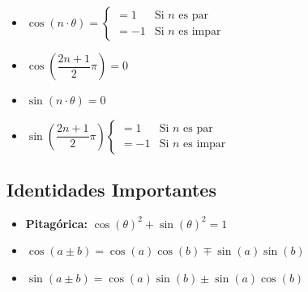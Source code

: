 \documentclass[12pt, fleqn]{report}                             %
\newcommand{\Wrap}[1]{\left( #1 \right)}                        %
\newcommand{\Cos}[1]{\cos\Wrap{#1}}                             %
\newcommand{\Sin}[1]{\sin\Wrap{#1}}                             %
\begin{document}
                \begin{itemize}
                    \item
                        $
                            \Cos{n \cdot \theta} = 
                            \begin{cases}
                                =  1 & \text{Si $n$ es par}      \\
                                = -1 & \text{Si $n$ es impar}
                            \end{cases} 
                        $                        

                    \item $\Cos{\dfrac{2n+1}{2} \pi } = 0$

                    \item $\Sin{n \cdot \theta} = 0$

                    \item
                        $
                            \Sin{\dfrac{2n+1}{2} \pi }
                            \begin{cases}
                                =  1 & \text{Si $n$ es par}      \\
                                = -1 & \text{Si $n$ es impar}
                            \end{cases}
                        $
                \end{itemize}




            \subsection{Identidades Importantes}

                \begin{itemize}
                    \item
                        \textbf{Pitagórica: } $\Cos{\theta}^2 + \Sin{\theta}^2 = 1$

                    \item 
                        $\Cos{a \pm b } = \Cos{a}\Cos{b} \mp \Sin{a}\Sin{b}$

                    \item
                        $\Sin{a \pm b } = \Cos{a}\Sin{b} \pm \Sin{a}\Cos{b}$

                \end{itemize}
\end{document}
